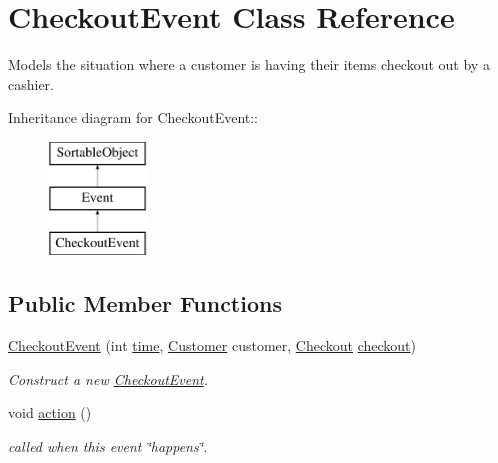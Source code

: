 \hypertarget{class_checkout_event}{
\section{CheckoutEvent Class Reference}
\label{class_checkout_event}
}
Models the situation where a customer is having their items checkout out by a cashier.  


Inheritance diagram for CheckoutEvent::\begin{figure}[H]
\begin{center}
\leavevmode
\includegraphics[height=3cm]{class_checkout_event}
\end{center}
\end{figure}
\subsection*{Public Member Functions}
\begin{CompactItemize}
\item 
\hyperlink{class_checkout_event_186ebd3d8ea22f2779526c6633a64b97}{CheckoutEvent} (int \hyperlink{class_event_d4c0fbb00c3fd993405df98bafcd52c5}{time}, \hyperlink{class_customer}{Customer} customer, \hyperlink{class_checkout}{Checkout} \hyperlink{class_checkout_event_dfce79e87746f130c500be6ccdf1ad47}{checkout})
\begin{CompactList}\small\item\em Construct a new \hyperlink{class_checkout_event}{CheckoutEvent}. \item\end{CompactList}\item 
void \hyperlink{class_checkout_event_cd029a04de786e0d128b3f4220724d4f}{action} ()
\begin{CompactList}\small\item\em called when this event \char`\"{}happens\char`\"{}. \item\end{CompactList}\end{CompactItemize}
